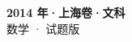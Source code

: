\documentclass[zihao=-4, a4paper]{ctexart}
\begin{document}
\begin{center}
  {\Large\bfseries 2014 年·上海卷·文科}\\[4pt]
  {\large 数学 · 试题版}
\end{center}
\medskip
{}

\end{document}
